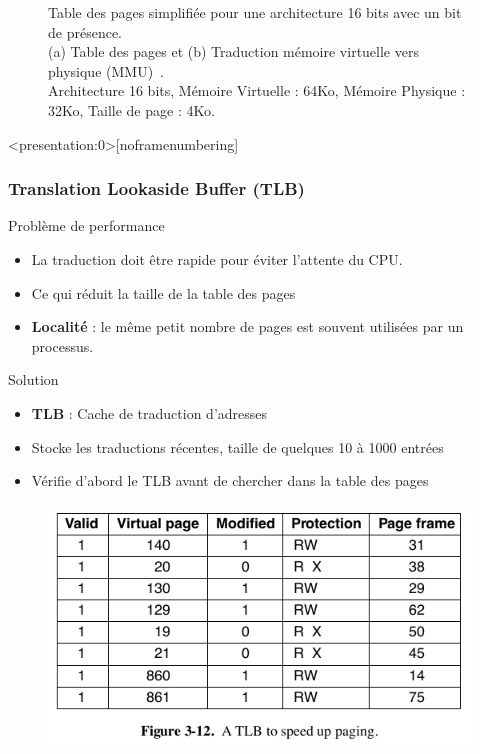 \documentclass[8pt]{beamer}
\begin{document}
\begin{frame}
\begin{figure}
\begin{minipage}[b]{0.5\linewidth}
            \subcaption{}
            \label{fig:page_mapping}
        \end{minipage}
        \caption{Table des pages simplifiée pour une architecture 16 bits avec
            un bit de
            pr\'esence. \\ (a) Table des pages et (b) Traduction mémoire
            virtuelle vers
            physique (MMU)~\cite{tanenbaum2009modern}. \\
            Architecture 16 bits,
            Mémoire Virtuelle : 64Ko, Mémoire Physique : 32Ko,
            Taille de page : 4Ko. \\
        }
    \end{figure}

\end{frame}

\begin{frame}<presentation:0>[noframenumbering]
    \frametitle{Translation Lookaside Buffer (TLB)}

    \begin{alertblock}{Problème de performance}
        \begin{itemize}
            \item La traduction doit \^etre rapide pour \'eviter
                  l'attente du
                  CPU.
            \item Ce qui r\'eduit la taille de la table des pages
            \item \textbf{Localité} : le même petit nombre de pages est souvent
                  utilisées par un processus.
        \end{itemize}
    \end{alertblock}
    \begin{exampleblock}{Solution}
        \begin{itemize}
            \item \textbf{TLB} : Cache de traduction d'adresses
            \item Stocke les traductions récentes, taille de quelques 10 à 1000
                  entrées
            \item Vérifie d'abord le TLB avant de chercher dans la table des
                  pages
        \end{itemize}
    \end{exampleblock}

    \begin{figure}
        \centering
        \includegraphics[width=.35\textwidth]{figures/TLB.png}
    \end{figure}
\end{frame}
\end{document}
